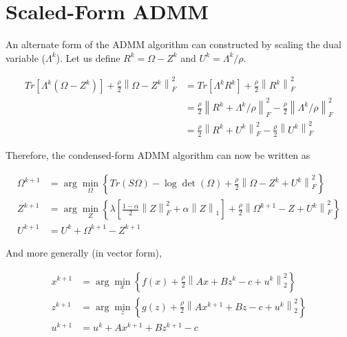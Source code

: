 \documentclass[11pt,]{book}
\theoremstyle{definition}
\theoremstyle{definition}
\theoremstyle{definition}
\theoremstyle{remark}
\begin{document}
\vspace{1cm}

\hypertarget{scaled-form-admm}{%
\section{Scaled-Form ADMM}\label{scaled-form-admm}}

An alternate form of the ADMM algorithm can constructed by scaling the
dual variable (\(\Lambda^{k}\)). Let us define
\(R^{k} = \Omega - Z^{k}\) and \(U^{k} = \Lambda^{k}/\rho\).

\begin{align*}
  Tr\left[ \Lambda^{k}\left( \Omega - Z^{k} \right) \right] + \frac{\rho}{2}\left\| \Omega - Z^{k} \right\|_{F}^{2} &= Tr\left[ \Lambda^{k}R^{k} \right] + \frac{\rho}{2}\left\| R^{k} \right\|_{F}^{2} \\
  &= \frac{\rho}{2}\left\| R^{k} + \Lambda^{k}/\rho \right\|_{F}^{2} - \frac{\rho}{2}\left\| \Lambda^{k}/\rho \right\|_{F}^{2} \\
  &= \frac{\rho}{2}\left\| R^{k} + U^{k} \right\|_{F}^{2} - \frac{\rho}{2}\left\| U^{k} \right\|_{F}^{2}
\end{align*}

Therefore, the condensed-form ADMM algorithm can now be written as

\begin{align}
  \Omega^{k + 1} &= \arg\min_{\Omega}\left\{ Tr\left(S\Omega\right) - \log\det\left(\Omega\right) + \frac{\rho}{2}\left\| \Omega - Z^{k} + U^{k} \right\|_{F}^{2} \right\} \\
  Z^{k + 1} &= \arg\min_{Z}\left\{ \lambda\left[ \frac{1 - \alpha}{2}\left\| Z \right\|_{F}^{2} + \alpha\left\| Z \right\|_{1} \right] + \frac{\rho}{2}\left\| \Omega^{k + 1} - Z + U^{k} \right\|_{F}^{2} \right\} \\
  U^{k + 1} &= U^{k} + \Omega^{k + 1} - Z^{k + 1}
\end{align}

And more generally (in vector form),

\begin{align}
  x^{k + 1} &= \arg\min_{x}\left\{ f(x) + \frac{\rho}{2}\left\| Ax + Bz^{k} - c + u^{k} \right\|_{2}^{2} \right\} \\
  z^{k + 1} &= \arg\min_{z}\left\{ g(z) + \frac{\rho}{2}\left\| Ax^{k + 1} + Bz - c + u^{k} \right\|_{2}^{2} \right\} \\
  u^{k + 1} &= u^{k} + Ax^{k + 1} + Bz^{k + 1} - c
\end{align}
\end{document}
